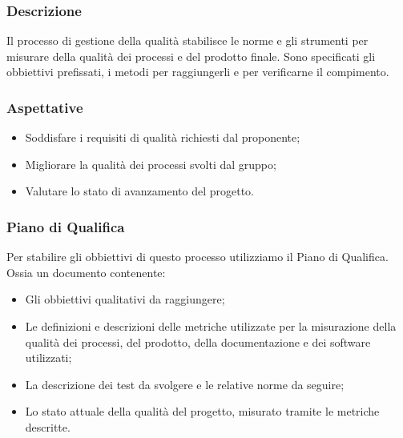 \subsubsection{Descrizione}
Il processo di gestione della qualità stabilisce le norme e gli strumenti per misurare della qualità dei processi e del prodotto finale. Sono specificati gli obbiettivi prefissati, i metodi per raggiungerli e per verificarne il compimento.

\subsubsection{Aspettative}
\begin{itemize}
    \item Soddisfare i requisiti di qualità richiesti dal proponente;
    \item Migliorare la qualità dei processi svolti dal gruppo;
    \item Valutare lo stato di avanzamento del progetto.
\end{itemize}

\subsubsection{Piano di Qualifica}
Per stabilire gli obbiettivi di questo processo utilizziamo il Piano di Qualifica. Ossia un documento contenente:
\begin{itemize}
    \item Gli obbiettivi qualitativi da raggiungere;
    \item Le definizioni e descrizioni delle metriche utilizzate per la misurazione della qualità dei processi, del prodotto, della documentazione e dei software utilizzati;
    \item La descrizione dei test da svolgere e le relative norme da seguire;
    \item Lo stato attuale della qualità del progetto, misurato tramite le metriche descritte.
\end{itemize}

